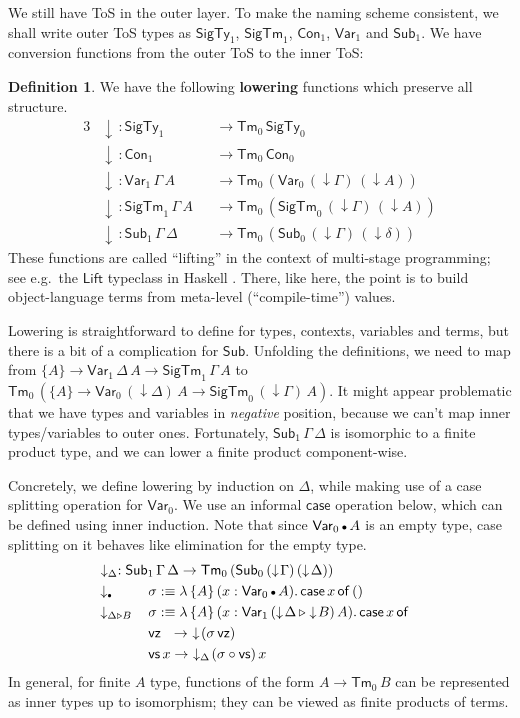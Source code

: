 \documentclass[12pt,a4paper,twoside,openany]{book}
\theoremstyle{remark}
\theoremstyle{definition}
\newtheorem{mydefinition}{Definition}
\theoremstyle{theorem}
\newcommand{\ms}[1]{\mathsf{#1}}
\newcommand{\Con}{\mathsf{Con}}
\newcommand{\Sub}{\mathsf{Sub}}
\newcommand{\Tm}{\mathsf{Tm}}
\newcommand{\ext}{\triangleright}
\newcommand{\emptycon}{\scaleobj{.75}\bullet}
\newcommand{\SigTy}{\mathsf{SigTy}}
\newcommand{\SigTm}{\mathsf{SigTm}}
\newcommand{\Var}{\ms{Var}}
\newcommand{\vz}{\ms{vz}}
\newcommand{\vs}{\ms{vs}}
\newcommand{\down}{\downarrow}
\newcommand{\defn}{:\equiv}
\begin{document}
We still have ToS in the outer layer. To make the naming
scheme consistent, we shall write outer ToS types as $\SigTy_1$,
$\SigTm_1$, $\Con_1$, $\Var_1$ and $\Sub_1$. We have conversion functions from
the outer ToS to the inner ToS:
\begin{mydefinition}
\label{def:simple-lowering}
We have the following \textbf{lowering} functions which
preserve all structure.
\begin{alignat*}{3}
  & \down\,: \SigTy_1 &&\to \Tm_0\,\SigTy_0\\
  & \down\,: \Con_1 &&\to \Tm_0\,\Con_0\\
  & \down\,: \Var_1\,\Gamma\,A &&\to \Tm_0\,(\Var_0\,(\down\!\Gamma)\,(\down\!A))\\
  & \down\,: \SigTm_1\,\Gamma\,A &&\to \Tm_0\,(\SigTm_0\,(\down\!\Gamma)\,(\down\!A))\\
  & \down\,: \Sub_1\,\Gamma\,\Delta &&\to \Tm_0\,(\Sub_0\,(\down\!\Gamma)\,(\down\!\delta))
\end{alignat*}
These functions are called ``lifting'' in the context of multi-stage
programming; see e.g.\ the $\ms{Lift}$ typeclass in Haskell
\cite{pickering-multistage}. There, like here, the point is to build
object-language terms from meta-level (``compile-time'') values.

Lowering is straightforward to define for types, contexts, variables and terms,
but there is a bit of a complication for $\Sub$. Unfolding the definitions, we
need to map from $\{A\} \to \Var_1\,\Delta\,A \to \SigTm_1\,\Gamma\,A$ to
$\Tm_0\,(\{A\} \to \Var_0\,(\down\Delta)\,A \to \SigTm_0\,(\down\Gamma)\,A)$. It
might appear problematic that we have types and variables in \emph{negative}
position, because we can't map inner types/variables to outer ones.
Fortunately, $\Sub_1\,\Gamma\,\Delta$ is isomorphic to a finite product type,
and we can lower a finite product component-wise.

Concretely, we define lowering by induction on $\Delta$, while making use of
a case splitting operation for $\Var_0$. We use an informal $\ms{case}$
operation below, which can be defined using inner induction. Note that since
$\Var_0\,\emptycon\,A$ is an empty type, case splitting on it behaves like
elimination for the empty type.
\begin{alignat*}{3}
  &\rlap{$\hspace{0.3em}\down_{\Delta} : \Sub_1\,\Gamma\,\Delta \to \Tm_0\,(\Sub_0\,(\down\!\Gamma)\,(\down\!\Delta))$}\\
  &\down_{\emptycon}\,&&\sigma \defn
      \lambda\,\{A\}\,(x : \Var_0\,\emptycon\,A).\,\ms{case}\,x\,\ms{of}\,()\\
  &\down_{\Delta\ext B}\,&&\sigma \defn
      \lambda\,\{A\}\,(x : \Var_1\,(\down\!\Delta\,\ext \down\!B)\,A).\,\ms{case}\,x\,\ms{of}\\
  & &&\vz\hspace{0.65em}\to\,\,\down\!(\sigma\,\vz)\\
  & &&\vs\,x \to\,\,\down_{\Delta}\!(\sigma \circ \vs)\,x
\end{alignat*}
In general, for finite $A$ type, functions of the form $A \to \Tm_0\,B$ can be
represented as inner types up to isomorphism; they can be viewed as finite
products of terms.


\end{mydefinition}
\end{document}
